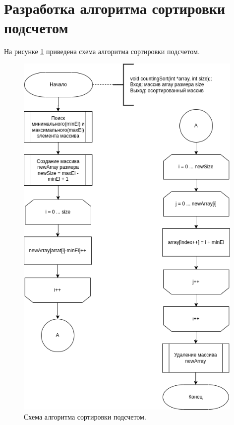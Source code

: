 \section{Разработка алгоритма сортировки подсчетом}
На рисунке \ref{img:counting} приведена схема алгоритма сортировки подсчетом.
\begin{figure}[h]
	\centering
	\includegraphics[width=110mm]{images/counting}
	\caption{Схема алгоритма сортировки подсчетом.}
	\label{img:counting}
\end{figure}
\newpage
